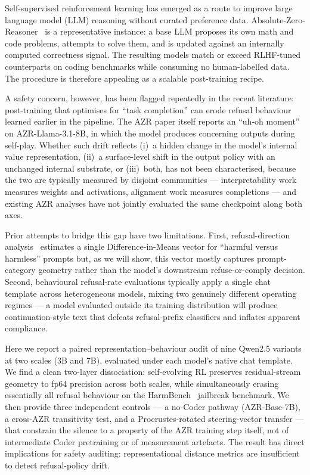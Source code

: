 \documentclass[11pt,a4paper]{article}
\begin{document}
Self-supervised reinforcement learning has emerged as a route to improve
large language model (LLM) reasoning without curated preference data.
Absolute-Zero-Reasoner~\citep{zhao2024azr} is a representative instance:
a base LLM proposes its own math and code problems, attempts to solve them,
and is updated against an internally computed correctness signal. The
resulting models match or exceed RLHF-tuned counterparts on coding
benchmarks while consuming no human-labelled data. The procedure is
therefore appealing as a scalable post-training recipe.

A safety concern, however, has been flagged repeatedly in the recent
literature: post-training that optimises for ``task completion'' can erode
refusal behaviour learned earlier in the pipeline. The AZR paper itself
reports an ``uh-oh moment'' on AZR-Llama-3.1-8B, in which the model produces
concerning outputs during self-play. Whether such drift reflects (i)~a
hidden change in the model's internal value representation, (ii)~a
surface-level shift in the output policy with an unchanged internal
substrate, or (iii)~both, has not been characterised, because the two are
typically measured by disjoint communities — interpretability work measures
weights and activations, alignment work measures completions — and existing
AZR analyses have not jointly evaluated the same checkpoint along both axes.

Prior attempts to bridge this gap have two limitations. First,
refusal-direction analysis~\citep{arditi2024refusal} estimates a single
Difference-in-Means vector for ``harmful versus harmless'' prompts but,
as we will show, this vector mostly captures prompt-category geometry
rather than the model's downstream refuse-or-comply decision. Second,
behavioural refusal-rate evaluations typically apply a single chat
template across heterogeneous models, mixing two genuinely different
operating regimes — a model evaluated outside its training distribution
will produce continuation-style text that defeats refusal-prefix
classifiers and inflates apparent compliance.

Here we report a paired representation--behaviour audit of nine Qwen2.5
variants at two scales (3B and 7B), evaluated under each model's
native chat template. We find a clean two-layer dissociation: self-evolving
RL preserves residual-stream geometry to fp64 precision across both scales,
while simultaneously erasing essentially all refusal behaviour on the
HarmBench~\citep{mazeika2024harmbench} jailbreak benchmark. We then provide
three independent controls — a no-Coder pathway (AZR-Base-7B), a cross-AZR
transitivity test, and a Procrustes-rotated steering-vector transfer —
that constrain the silence to a property of the AZR training step itself,
not of intermediate Coder pretraining or of measurement artefacts. The
result has direct implications for safety auditing: representational
distance metrics are insufficient to detect refusal-policy drift.
\end{document}
